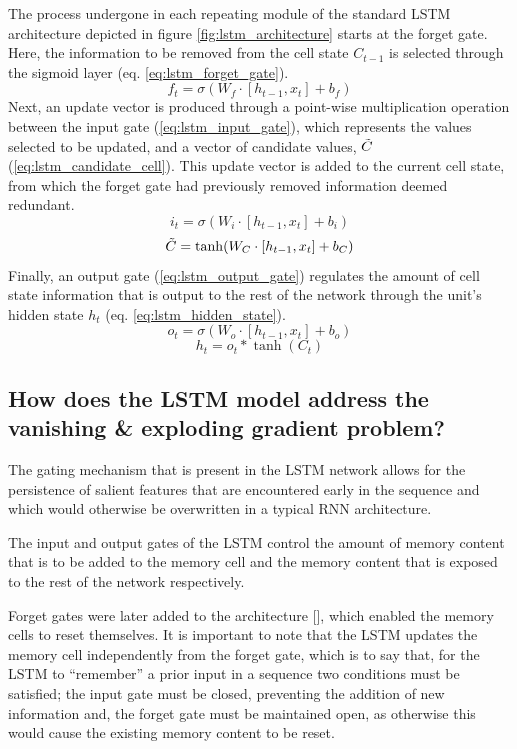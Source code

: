 \documentclass[12pt, a4paper]{report}
\theoremstyle{definition}
\theoremstyle{definition}%
\theoremstyle{definition}%
\theoremstyle{definition}%
\theoremstyle{definition}%
\theoremstyle{definition}%
\renewcommand{\cite}[1]{[\citealp{#1}]}
\begin{document}
The process undergone in each repeating module of the standard LSTM architecture depicted in figure \ref{fig:lstm_architecture} starts at the forget gate. Here, the information to be removed from the cell state $C_{t-1}$ is selected through the sigmoid layer (eq. \ref{eq:lstm_forget_gate}).
\begin{equation} \label{eq:lstm_forget_gate}
	f_t = \sigma(W_f\cdot[h_{t-1},x_t] + b_f)
\end{equation}
Next, an update vector is produced through a point-wise multiplication operation between the input gate (\ref{eq:lstm_input_gate}), which represents the values selected to be updated, and a vector of candidate values, $\Tilde{C}$ (\ref{eq:lstm_candidate_cell}). This update vector is added to the current cell state, from which the forget gate had previously removed information deemed redundant.
\begin{equation} \label{eq:lstm_input_gate}
	i_t = \sigma(W_i\cdot[h_{t-1},x_t] + b_i)
\end{equation}
\begin{equation} \label{eq:lstm_candidate_cell}
	\Tilde{C} = \tanh(W_C\cdot[h_{t-1},x_t] + b_C)
\end{equation}
Finally, an output gate (\ref{eq:lstm_output_gate}) regulates the amount of cell state information that is output to the rest of the network through the unit's hidden state $h_t$ (eq. \ref{eq:lstm_hidden_state}).
\begin{equation} \label{eq:lstm_output_gate}
	o_t = \sigma(W_o\cdot[h_{t-1},x_t] + b_o)
\end{equation}
\begin{equation} \label{eq:lstm_hidden_state}
	h_t = o_t*\tanh(C_t)
\end{equation}

\subsection{How does the LSTM model address the  vanishing \& exploding gradient problem?}
The gating mechanism that is present in the LSTM network allows for the persistence of salient features that are encountered early in the sequence and which would otherwise be overwritten in a typical RNN architecture.

The input and output gates of the LSTM control the amount of memory content that is to be added to the memory cell and the memory content that is exposed to the rest of the network respectively.

Forget gates were later added to the architecture \cite{gers2000}, which enabled the memory cells to reset themselves. It is important to note that the LSTM updates the memory cell independently from the forget gate, which is to say that, for the LSTM to \enquote{remember} a prior input in a sequence two conditions must be satisfied; the input gate must be closed, preventing the addition of new information and, the forget gate must be maintained open, as otherwise this would cause the existing memory content to be reset.
\end{document}
